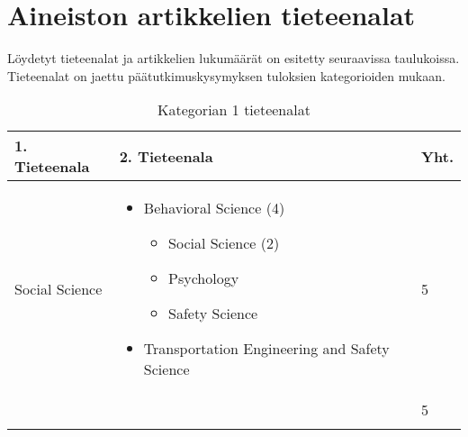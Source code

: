 \documentclass[utf8]{gradu3}
\begin{document}
\section{Aineiston artikkelien tieteenalat} \label{tieteenalat}
\begin{comment}
Vasta toisella lukemisella ja taulukkojen selaamisella ymmärsin, mitä tässä ajetaan takaa. Sinähän et jaa tieteealoja mihinkään vaan jaottelet eri tarkoituksiin tähtääviä papereita tieteenaloittain nähdäksesi, miten eri tavoitteet näkyvät mahdollisesti eri aloilla.

Olisiko iso vaiva tehdä yksi taulukko jossa olisi toisena dimensiona laadullisen simuloinnin tavoite ja toisena päätieteenala. Saisiko tästä ehkä jopa heat mapin (missä soluissa on isot frekvenssit, missä pienemmät). Päätieteenalojen sisälle porautumista voisi miettiä myös sen edellä esitetyn kolmen pääluokan tasolla, mikä voisi keventää taulukoitavaa asiaa.
\end{comment}
Löydetyt tieteenalat ja artikkelien lukumäärät on esitetty seuraavissa taulukoissa.
Tieteenalat on jaettu päätutkimuskysymyksen tuloksien kategorioiden mukaan.
\pagebreak

\begin{comment}
Kategoria x on aika huonosti sisältöä kuvaava nimi. Kannattaa nimetä kuvaavammin. Samoin mietin, mistä tulee esitysjärjestys. Onko sille jokin perustelu? Science Directin luokkien numerointi?
\end{comment}

\begin{longtable}[h]{|p{5cm}|p{8cm}|p{1cm}|}
    \hline
    \textbf{1. Tieteenala}    & \textbf{2. Tieteenala} & \textbf{Yht.} \\
    \hline
    Social Science  &  
    \begin{itemize}[nosep]
        \item Behavioral Science (4) 
        \begin{itemize}[nosep]
            \item Social Science (2)
            \item Psychology 
            \item Safety Science
        \end{itemize}
        \item Transportation Engineering and Safety Science 
    \end{itemize}  
    & 5 \\
    \hline
            &   & 5 \\
    \hline
    \caption{Kategorian 1 tieteenalat}
    \label{table:tieteenalat1}
\end{longtable}
\end{document}
